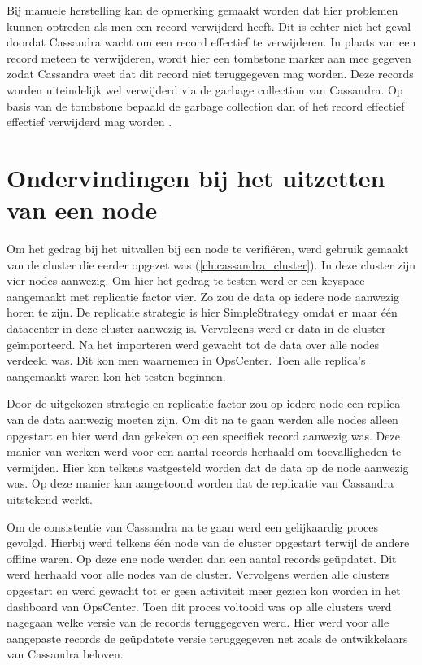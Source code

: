 Bij manuele herstelling kan de opmerking gemaakt worden dat hier problemen kunnen optreden als men een record verwijderd heeft.
Dit is echter niet het geval doordat Cassandra wacht om een record effectief te verwijderen.
In plaats van een record meteen te verwijderen, wordt hier een tombstone marker aan mee gegeven zodat Cassandra weet dat dit record niet teruggegeven mag worden.
Deze records worden uiteindelijk wel verwijderd via de garbage collection van Cassandra.
Op basis van de tombstone bepaald de garbage collection dan of het record effectief effectief verwijderd mag worden \citep{strickland2014availability}.

\section{Ondervindingen bij het uitzetten van een node}
Om het gedrag bij het uitvallen bij een node te verifiëren, werd gebruik gemaakt van de cluster die eerder opgezet was (\ref{ch:cassandra_cluster}).
In deze cluster zijn vier nodes aanwezig.
Om hier het gedrag te testen werd er een keyspace aangemaakt met replicatie factor vier.
Zo zou de data op iedere node aanwezig horen te zijn.
De replicatie strategie is hier SimpleStrategy omdat er maar één datacenter in deze cluster aanwezig is. Vervolgens werd er data in de cluster geïmporteerd.
Na het importeren werd gewacht tot de data over alle nodes verdeeld was.
Dit kon men waarnemen in OpsCenter.
Toen alle replica's aangemaakt waren kon het testen beginnen.

Door de uitgekozen strategie en replicatie factor zou op iedere node een replica van de data aanwezig moeten zijn.
Om dit na te gaan werden alle nodes alleen opgestart en hier werd dan gekeken op een specifiek record aanwezig was.
Deze manier van werken werd voor een aantal records herhaald om toevalligheden te vermijden.
Hier kon telkens vastgesteld worden dat de data op de node aanwezig was.
Op deze manier kan aangetoond worden dat de replicatie van Cassandra uitstekend werkt.

Om de consistentie van Cassandra na te gaan werd een gelijkaardig proces gevolgd.
Hierbij werd telkens één node van de cluster opgestart terwijl de andere offline waren.
Op deze ene node werden dan een aantal records geüpdatet.
Dit werd herhaald voor alle nodes van de cluster.
Vervolgens werden alle clusters opgestart en werd gewacht tot er geen activiteit meer gezien kon worden in het dashboard van OpsCenter.
Toen dit proces voltooid was op alle clusters werd nagegaan welke versie van de records teruggegeven werd.
Hier werd voor alle aangepaste records de geüpdatete versie teruggegeven net zoals de ontwikkelaars van Cassandra beloven.

